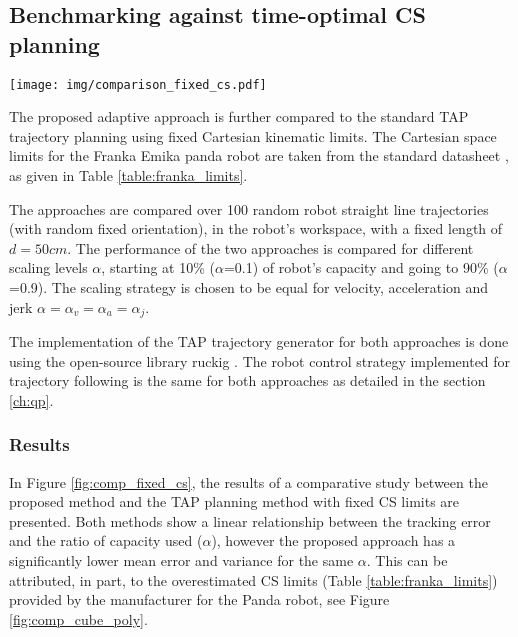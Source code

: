 \subsection{Benchmarking against time-optimal  CS planning}



\begin{figure*}[!t]
    \centering
    \texttt{[image: img/comparison\_fixed\_cs.pdf]}
    \caption{Result of the benchmarking experiment comparing the fixed CS planning approach (red) to the proposed method (blue). The graph on the left shows comparison of the max tracking error with respect to the ratio of the capacity $\alpha$ used while the graph in the middle shows the trajectory execution time comparison. The graph on the right unites the two graphs on the left in order to show the relation of the trajectory execution time against the max tracking error. Means and variances are calculated on 100 random robot trajectories. }
    \label{fig:comp_fixed_cs}
\end{figure*}
The proposed adaptive approach is further compared to the standard TAP trajectory planning using fixed Cartesian kinematic limits. The Cartesian space limits for the Franka Emika panda robot are taken from the standard datasheet \cite{frankadata}, as given in Table \ref{table:franka_limits}.

The approaches are compared over 100 random robot straight line trajectories (with random fixed orientation), in the robot's workspace, with a fixed length of $d=50cm$. The performance of the two approaches is compared for different scaling levels $\alpha$, starting at 10\% ($\alpha$=0.1) of robot's capacity and going to 90\% ($\alpha$=0.9). The scaling strategy is chosen to be equal for velocity, acceleration and jerk $\alpha\!=\!\alpha_v\!=\!\alpha_a\!=\!\alpha_j$. 



The implementation of the TAP trajectory generator for both approaches is done using the open-source library ruckig \cite{ruckig}. The robot control strategy implemented for trajectory following is the same for both approaches as detailed in the section \ref{ch:qp}.

\subsubsection*{Results} In Figure \ref{fig:comp_fixed_cs}, the results of a comparative study between the proposed method and the TAP planning method with fixed CS limits are presented. Both methods show a linear relationship between the tracking error and the ratio of capacity used ($\alpha$), however the proposed approach has a significantly lower mean error and variance for the same $\alpha$. This can be attributed, in part, to the overestimated CS limits (Table \ref{table:franka_limits}) provided by the manufacturer for the Panda robot, see Figure \ref{fig:comp_cube_poly}.


